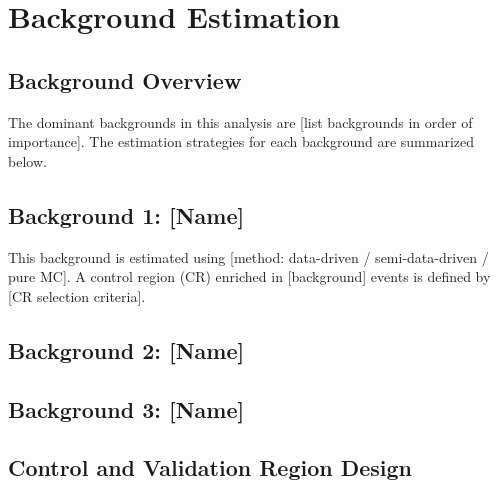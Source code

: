 
\section{Background Estimation}
\label{sec:background}


\subsection{Background Overview}
\label{sec:background:overview}

The dominant backgrounds in this analysis are [list backgrounds in order of
importance]. The estimation strategies for each background are summarized
below.

\subsection{Background 1: [Name]}
\label{sec:background:bkg1}


This background is estimated using [method: data-driven / semi-data-driven /
pure MC]. A control region (CR) enriched in [background] events is defined
by [CR selection criteria].

\subsection{Background 2: [Name]}
\label{sec:background:bkg2}


\subsection{Background 3: [Name]}
\label{sec:background:bkg3}


\subsection{Control and Validation Region Design}
\label{sec:background:regions}

